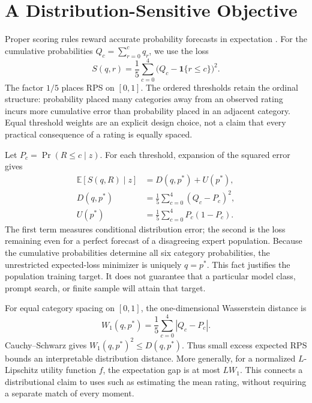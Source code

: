 \section{A Distribution-Sensitive Objective}
\label{sec:objective}
Proper scoring rules reward accurate probability forecasts in expectation \citep{gneiting2007strictly}.
For the cumulative probabilities $Q_c=\sum_{r=0}^c q_r$, we use the loss
\begin{equation}
 S(q,r)=\frac{1}{5}\sum_{c=0}^{4}
       \bigl(Q_c-\mathbf{1}\{r\leq c\}\bigr)^2.
 \label{eq:rps}
\end{equation}
The factor $1/5$ places RPS on $[0,1]$.
The ordered thresholds retain the ordinal structure: probability placed many categories away from an observed rating incurs more cumulative error than probability placed in an adjacent category.
Equal threshold weights are an explicit design choice, not a claim that every practical consequence of a rating is equally spaced.

Let $P_c=\Pr(R\leq c\mid z)$.
For each threshold, expansion of the squared error gives
\begin{align}
 \mathbb E[S(q,R)\mid z]
 &=D(q,p^*)+U(p^*),\\
 D(q,p^*)&=\frac{1}{5}\sum_{c=0}^{4}(Q_c-P_c)^2,\\
 U(p^*)&=\frac{1}{5}\sum_{c=0}^{4}P_c(1-P_c).
 \label{eq:decomposition}
\end{align}
The first term measures conditional distribution error; the second is the loss remaining even for a perfect forecast of a disagreeing expert population.
Because the cumulative probabilities determine all six category probabilities, the unrestricted expected-loss minimizer is uniquely $q=p^*$.
This fact justifies the population training target.
It does not guarantee that a particular model class, prompt search, or finite sample will attain that target.

For equal category spacing on $[0,1]$, the one-dimensional Wasserstein distance is
\begin{equation}
 W_1(q,p^*)=\frac{1}{5}\sum_{c=0}^{4}|Q_c-P_c|.
\end{equation}
Cauchy--Schwarz gives $W_1(q,p^*)^2\leq D(q,p^*)$.
Thus small excess expected RPS bounds an interpretable distribution distance.
More generally, for a normalized $L$-Lipschitz utility function $f$, the expectation gap is at most $L W_1$.
This connects a distributional claim to uses such as estimating the mean rating, without requiring a separate match of every moment.


